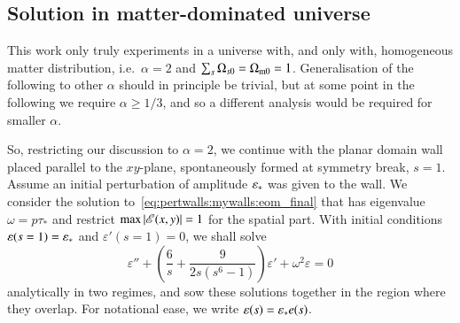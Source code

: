 


\subsection{Solution in matter-dominated universe}
    This work only truly experiments in a universe with, and only with, homogeneous matter distribution, i.e.~$\alpha=2$ and $\sum_{s}\Omega_{s0}=\Omega_\mathrm{m0}=1$. Generalisation of the following to other $\alpha$ should in principle be trivial, but at some point in the following we require $\alpha\geq 1/3$, and so a different analysis would be required for smaller $\alpha$.

    So, restricting our discussion to $\alpha=2$, we continue with the planar domain wall placed parallel to the $xy$-plane, spontaneously formed at symmetry break, $s=1$. Assume an initial perturbation of amplitude $\varepsilon_\ast$ was given to the wall. We consider the solution to~\cref{eq:pertwalls:mywalls:eom_final} that has eigenvalue $\omega=p\tau_\ast$ and restrict $\max{\abs{\mathscr{E}(x,y)}}=1$ for the spatial part.
    With initial conditions $\varepsilon(s=1)=\varepsilon_\ast$ and $\varepsilon'(s=1)=0$, we shall solve
    \begin{equation}\label{eq:pertwalls:mywalls:eom_eps_s_MD}
        \varepsilon'' + \left( \frac{6}{s}  +\frac{9}{2s\left(s^6-1\right)} \right) \varepsilon' + \omega^2 \varepsilon = 0
    \end{equation}
    analytically in two regimes, and sow these solutions together in the region where they overlap. For notational ease, we write $\varepsilon(s) = \varepsilon_\ast e(s)$.
    

